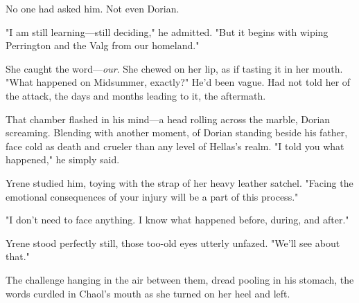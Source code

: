 No one had asked him. Not even Dorian.

"I am still learning---still  deciding," he admitted. "But it begins with wiping Perrington and the Valg from our homeland."

She caught the word---\emph{our}. She chewed on her lip, as if tasting it in her mouth. "What happened on Midsummer, exactly?" He'd been vague. Had not told her of the attack, the days and months leading to it, the aftermath.

That chamber flashed in his mind---a head rolling across the marble, Dorian screaming. Blending with another moment, of Dorian standing beside his father, face cold as death and crueler than any level of Hellas's realm. "I told you what happened," he simply said.

Yrene studied him, toying with the strap of her heavy leather satchel. "Facing the emotional consequences of your injury will be a part of this process."

"I don't need to face anything. I know what happened before, during, and after."

Yrene stood perfectly still, those too-old eyes utterly unfazed. "We'll see about that."

The challenge hanging in the air between them, dread pooling in his stomach, the words curdled in Chaol's mouth as she turned on her heel and left.

